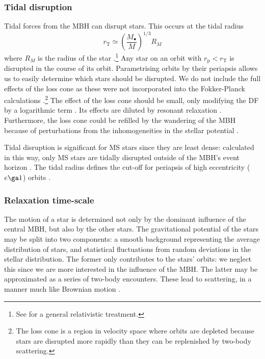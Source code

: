 \documentclass[useAMS,usedcolumn,usegraphicx,usenatbib]{mn2e}
\newcommand{\sub}[1]{\ensuremath{_\mathrm{#1}}}
\begin{document}
\subsubsection{Tidal disruption}

Tidal forces from the MBH can disrupt stars. This occurs at the tidal radius
\begin{equation}
r\sub{T} \simeq \left(\frac{M_\bullet}{M}\right)^{1/3}R_M
\label{eq:Tidal}
\end{equation}
where $R_M$ is the radius of the star \citep{Hills1975, Rees1988, Kobayashi2004}.\footnote{See \citet{Kesden2012} for a general relativistic treatment.} Any star on an orbit with $r\sub{p} < r\sub{T}$ is disrupted in the course of its orbit. Parametrising orbits by their periapsis allows us to easily determine which stars should be disrupted. We do not include the full effects of the loss cone \citep{Frank1976, Lightman1977, Cohn1978} as these were not incorporated into the Fokker-Planck calculations \citep{Hopman2009}.\footnote{The loss cone is a region in velocity space where orbits are depleted because stars are disrupted more rapidly than they can be replenished by two-body scattering.} The effect of the loss cone should be small, only modifying the DF by a logarithmic term \citep{Lightman1977, Bahcall1977, Cohn1978}. Its effects are diluted by resonant relaxation \citep{Hopman2007,Toonen2009,Merritt2011}. Furthermore, the loss cone could be refilled by the wandering of the MBH because of perturbations from the inhomogeneities in the stellar potential \citep{Sigurdsson1997,Chatterjee2002,Merritt2007}.

Tidal disruption is significant for MS stars since they are least dense: calculated in this way, only MS stars are tidally disrupted outside of the MBH's event horizon \citep{Sigurdsson1997}. The tidal radius defines the cut-off for periapsis of high eccentricity ($e \ga 1$) orbits \citep{Lightman1977}.

\subsubsection{Relaxation time-scale}\label{sec:Relax}

The motion of a star is determined not only by the dominant influence of the central MBH, but also by the other stars. The gravitational potential of the stars may be split into two components: a smooth background representing the average distribution of stars, and statistical fluctuations from random deviations in the stellar distribution. The former only contributes to the stars' orbits: we neglect this since we are more interested in the influence of the MBH. The latter may be approximated as a series of two-body encounters. These lead to scattering, in a manner much like Brownian motion \citep{Bekenstein1992,Maoz1993,Nelson1999}.
\end{document}

